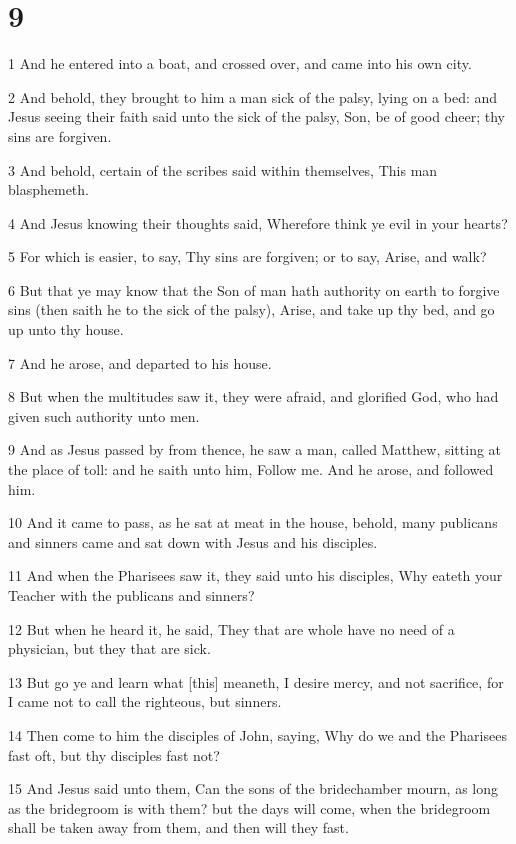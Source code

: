 \chapter{9}

\par 1 And he entered into a boat, and crossed over, and came into his own city.
\par 2 And behold, they brought to him a man sick of the palsy, lying on a bed: and Jesus seeing their faith said unto the sick of the palsy, Son, be of good cheer; thy sins are forgiven.
\par 3 And behold, certain of the scribes said within themselves, This man blasphemeth.
\par 4 And Jesus knowing their thoughts said, Wherefore think ye evil in your hearts?
\par 5 For which is easier, to say, Thy sins are forgiven; or to say, Arise, and walk?
\par 6 But that ye may know that the Son of man hath authority on earth to forgive sins (then saith he to the sick of the palsy), Arise, and take up thy bed, and go up unto thy house.
\par 7 And he arose, and departed to his house.
\par 8 But when the multitudes saw it, they were afraid, and glorified God, who had given such authority unto men.
\par 9 And as Jesus passed by from thence, he saw a man, called Matthew, sitting at the place of toll: and he saith unto him, Follow me. And he arose, and followed him.
\par 10 And it came to pass, as he sat at meat in the house, behold, many publicans and sinners came and sat down with Jesus and his disciples.
\par 11 And when the Pharisees saw it, they said unto his disciples, Why eateth your Teacher with the publicans and sinners?
\par 12 But when he heard it, he said, They that are whole have no need of a physician, but they that are sick.
\par 13 But go ye and learn what [this] meaneth, I desire mercy, and not sacrifice, for I came not to call the righteous, but sinners.
\par 14 Then come to him the disciples of John, saying, Why do we and the Pharisees fast oft, but thy disciples fast not?
\par 15 And Jesus said unto them, Can the sons of the bridechamber mourn, as long as the bridegroom is with them? but the days will come, when the bridegroom shall be taken away from them, and then will they fast.
